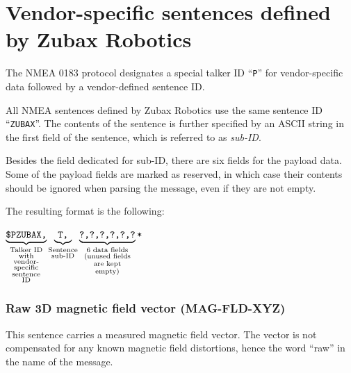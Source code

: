 \documentclass{zubaxdoc}
\begin{document}
\section{Vendor-specific sentences defined by Zubax Robotics}

The NMEA 0183 protocol designates a special talker ID ``\verb|P|'' for vendor-specific data
followed by a vendor-defined sentence ID.

All NMEA sentences defined by Zubax Robotics use the same sentence ID ``\verb|ZUBAX|''.
The contents of the sentence is further specified by an ASCII string in the first field of the sentence,
which is referred to as \emph{sub-ID}.

Besides the field dedicated for sub-ID, there are six fields for the payload data.
Some of the payload fields are marked as reserved,
in which case their contents should be ignored when parsing the message,
even if they are not empty.

The resulting format is the following:

$%
\underbrace{\texttt{\$PZUBAX,}}_{\substack{\text{Talker ID}\\%
                                           \text{with}\\%
                                           \text{vendor-}\\%
                                           \text{specific}\\%
                                           \text{sentence}\\%
                                           \text{ID}}}%
\underbrace{\texttt{T,}}_{\substack{\text{Sentence} \\ \text{sub-ID}}}%
\underbrace{\texttt{?,?,?,?,?,?}}_{\substack{\text{6 data fields}\\%
                                             \text{(unused fields}\\%
                                             \text{are kept}\\%
                                             \text{empty)}}}%
\texttt{\text{*}}$

\subsubsection{Raw 3D magnetic field vector (MAG-FLD-XYZ)}\label{sec:nmea_sentence_MAG-FLD-XYZ}

This sentence carries a measured magnetic field vector.
The vector is not compensated for any known magnetic field distortions,
hence the word ``raw'' in the name of the message.
\end{document}
